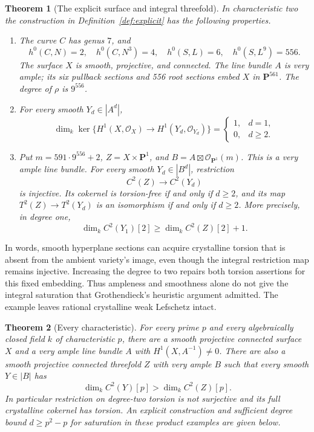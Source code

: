 \documentclass[11pt,a4paper]{article}
\newcommand{\OO}{\mathcal O}
\newcommand{\PP}{\mathbf P}
\newtheorem{theorem}{Theorem}[section]
\theoremstyle{definition}\newtheorem{definition}[theorem]{Definition}
\theoremstyle{remark}\newtheorem{remark}[theorem]{Remark}
\numberwithin{equation}{section}
\begin{document}
\begin{theorem}[The explicit surface and integral threefold]\label{thm:main}
In characteristic two the construction in Definition~\ref{def:explicit} has the following properties.
\begin{enumerate}
\item The curve $C$ has genus $7$, and
\[
 h^0(C,N)=2,\quad h^0(C,N^3)=4,\quad
 h^0(S,L)=6,\quad h^0(S,L^9)=556.
\]
The surface $X$ is smooth, projective, and connected. The line bundle $A$ is very ample; its six pullback sections and 556 root sections embed $X$ in $\PP^{561}$. The degree of $\rho$ is $9^{556}$.
\item For every smooth $Y_d\in|A^d|$,
\[
 \dim_k\ker\{H^1(X,\OO_X)\to H^1(Y_d,\OO_{Y_d})\}
 =\begin{cases}1,&d=1,\\0,&d\ge2.\end{cases}
\]
\item Put $m=591\cdot9^{556}+2$, $Z=X\times\PP^1$, and
$B=A\boxtimes\OO_{\PP^1}(m)$. This is a very ample line bundle. For every smooth $Y_d\in|B^d|$, restriction
\[
 C^2(Z)\longrightarrow C^2(Y_d)
\]
is injective. Its cokernel is torsion-free if and only if $d\ge2$, and its map $T^2(Z)\to T^2(Y_d)$ is an isomorphism if and only if $d\ge2$. More precisely, in degree one,
\[
 \dim_k C^2(Y_1)[2]\ge\dim_k C^2(Z)[2]+1.
\]
\end{enumerate}
\end{theorem}

In words, smooth hyperplane sections can acquire crystalline torsion that is absent from the ambient variety's image, even though the integral restriction map remains injective. Increasing the degree to two repairs both torsion assertions for this fixed embedding. Thus ampleness and smoothness alone do not give the integral saturation that Grothendieck's heuristic argument admitted. The example leaves rational crystalline weak Lefschetz intact.

\begin{theorem}[Every characteristic]\label{thm:all-primes}
For every prime $p$ and every algebraically closed field $k$ of characteristic $p$, there are a smooth projective connected surface $X$ and a very ample line bundle $A$ with $H^1(X,A^{-1})\ne0$. There are also a smooth projective connected threefold $Z$ with very ample $B$ such that every smooth $Y\in|B|$ has
\[
 \dim_k C^2(Y)[p]>\dim_k C^2(Z)[p].
\]
In particular restriction on degree-two torsion is not surjective and its full crystalline cokernel has torsion. An explicit construction and sufficient degree bound $d\ge p^2-p$ for saturation in these product examples are given below.
\end{theorem}
\end{document}
